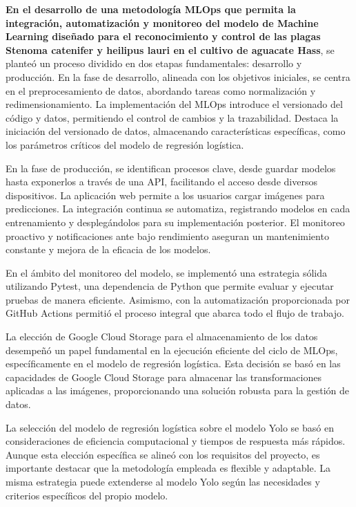 \textbf{En el desarrollo de una metodología MLOps que permita la integración, automatización y monitoreo del modelo de Machine Learning diseñado para el reconocimiento y control de las plagas Stenoma catenifer y heilipus lauri en el cultivo de aguacate Hass}, se planteó un proceso dividido en dos etapas fundamentales: desarrollo y producción. En la fase de desarrollo, alineada con los objetivos iniciales, se centra en el preprocesamiento de datos, abordando tareas como normalización y redimensionamiento. La implementación del MLOps introduce el versionado del código y datos, permitiendo el control de cambios y la trazabilidad. Destaca la iniciación del versionado de datos, almacenando características específicas, como los parámetros críticos del modelo de regresión logística. 

En la fase de producción, se identifican procesos clave, desde guardar modelos hasta exponerlos a través de una API, facilitando el acceso desde diversos dispositivos. La aplicación web permite a los usuarios cargar imágenes para predicciones. La integración continua se automatiza, registrando modelos en cada entrenamiento y desplegándolos para su implementación posterior. El monitoreo proactivo y notificaciones ante bajo rendimiento aseguran un mantenimiento constante y mejora de la eficacia de los modelos.

En el ámbito del monitoreo del modelo, se implementó una estrategia sólida utilizando Pytest, una dependencia de Python que permite evaluar y ejecutar pruebas de manera eficiente. Asimismo, con la automatización proporcionada por GitHub Actions permitió el proceso integral que abarca todo el flujo de trabajo.

\newpage

La elección de Google Cloud Storage para el almacenamiento de los datos desempeñó un papel fundamental en la ejecución eficiente del ciclo de MLOps, específicamente en el modelo de regresión logística. Esta decisión se basó en las capacidades de Google Cloud Storage para almacenar las transformaciones aplicadas a las imágenes, proporcionando una solución robusta para la gestión de datos.

La selección del modelo de regresión logística sobre el modelo Yolo se basó en consideraciones de eficiencia computacional y tiempos de respuesta más rápidos. Aunque esta elección específica se alineó con los requisitos del proyecto, es importante destacar que la metodología empleada es flexible y adaptable. La misma estrategia puede extenderse al modelo Yolo según las necesidades y criterios específicos del propio modelo.

